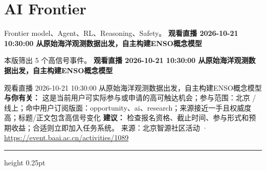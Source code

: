 \documentclass[10.5pt]{ctexart}
\begin{document}
\section*{AI Frontier}
{\color{ormuted} Frontier model、Agent、RL、Reasoning、Safety。}
\vspace{2mm}
{\LARGE\bfseries 观看直播 2026-10-21 10:30:00 从原始海‮观洋‬测数据出发，自主构建ENSO概念模型}\par
\vspace{1mm}
{\color{ormuted} 本版筛出 5 个高信号事件。}
\vspace{3mm}
{\Large\bfseries 观看直播 2026-10-21 10:30:00 从原始海‮观洋‬测数据出发，自主构建ENSO概念模型}\par
观看直播 2026-10-21 10:30:00 从原始海‮观洋‬测数据出发，自主构建ENSO概念模型
\textbf{与你有关：} 这是当前用户可实际参与或申请的高可触达机会；参与范围：北京 / 线上；命中用户订阅版面：opportunity、ai、research；来源接近一手且权威度高；标题/正文包含高信号变化
\textbf{建议：} 检查报名资格、截止时间、参与形式和预期收益；合适则立即加入任务系统。
{\footnotesize\color{ormuted} 来源：北京智源社区活动 · \url{https://event.baai.ac.cn/activities/1089}}
\vspace{4mm}
\hrule height 0.25pt
\vspace{3mm}
\end{document}
